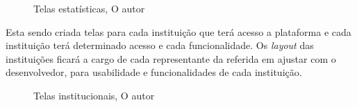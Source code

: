 \begin{figure}[H]
    \caption{Telas estatísticas, O autor}\label{fig:telas_plataforma}
\end{figure}

\par Esta sendo criada telas para cada instituição que terá acesso a plataforma e cada instituição terá determinado acesso e cada funcionalidade. Os \textit{layout} das instituições ficará a cargo de cada representante da referida em ajustar com o desenvolvedor, para usabilidade e funcionalidades de cada instituição.

\begin{figure}[H]
    \center
    \caption{Telas institucionais, O autor}\label{fig:telas_plataforma}
\end{figure}



